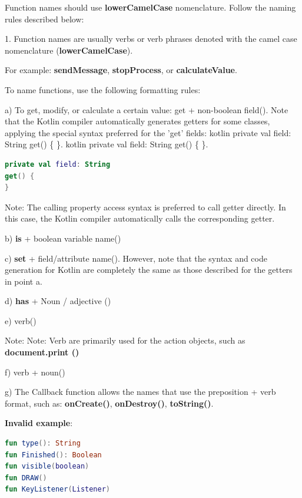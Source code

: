 \label{sec:1.4.1}

Function names should use \textbf{lowerCamelCase} nomenclature. Follow the naming rules described below:

1.	Function names are usually verbs or verb phrases denoted with the camel case nomenclature (\textbf{lowerCamelCase}).

For example: \textbf{sendMessage}, \textbf{stopProcess}, or \textbf{calculateValue}.

To name functions, use the following formatting rules:



a) To get, modify, or calculate a certain value: get + non-boolean field(). Note that the Kotlin compiler automatically generates getters for some classes, applying the special syntax preferred for the 'get' fields: kotlin private val field: String get() \{ \}. kotlin private val field: String get() \{ \}.

\begin{lstlisting}[language=Kotlin]
private val field: String
get() {
}
\end{lstlisting}
Note: The calling property access syntax is preferred to call getter directly. In this case, the Kotlin compiler automatically calls the corresponding getter.



b) \textbf{is} + boolean variable name()



c) \textbf{set} + field/attribute name(). However, note that the syntax and code generation for Kotlin are completely the same as those described for the getters in point a.



d) \textbf{has} + Noun / adjective ()



e) verb()

Note: Note: Verb are primarily used for the action objects, such as \textbf{document.print ()}



f) verb + noun() 



g) The Callback function allows the names that use the preposition + verb format, such as: \textbf{onCreate()}, \textbf{onDestroy()}, \textbf{toString()}.



\textbf{Invalid example}: 



\begin{lstlisting}[language=Kotlin]
fun type(): String
fun Finished(): Boolean
fun visible(boolean)
fun DRAW()
fun KeyListener(Listener)
\end{lstlisting}


